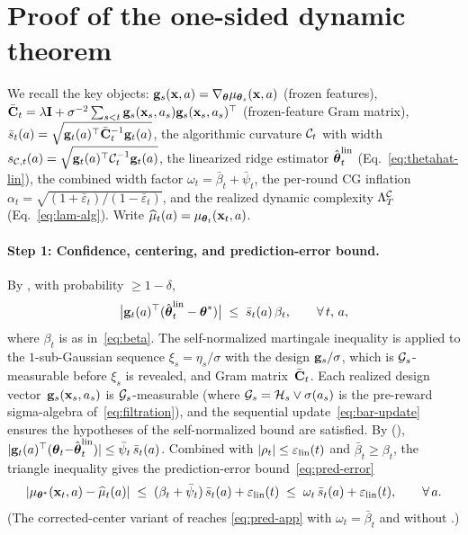 \section{Proof of the one-sided dynamic theorem}\label{app:proof}

We recall the key objects:
$\mathbf{g}_s(\mathbf{x},a)=\nabla_{\boldsymbol{\theta}}\mu_{\boldsymbol{\theta}_s}(\mathbf{x},a)$ (frozen features),
$\bar{\mathbf{C}}_t=\lambda\mathbf{I}+\sigma^{-2}\sum_{s<t}\mathbf{g}_s(\mathbf{x}_s,a_s)\mathbf{g}_s(\mathbf{x}_s,a_s)^\top$
(frozen-feature Gram matrix),
$\bar s_t(a)=\sqrt{\mathbf{g}_t(a)^\top\bar{\mathbf{C}}_t^{-1}\mathbf{g}_t(a)}$,
the algorithmic curvature $\mathcal{C}_t$ with width
$s_{\mathcal{C},t}(a)=\sqrt{\mathbf{g}_t(a)^\top\mathcal{C}_t^{-1}\mathbf{g}_t(a)}$,
the linearized ridge estimator $\hat{\boldsymbol{\theta}}_t^{\mathrm{lin}}$
(Eq.~\ref{eq:thetahat-lin}), the combined width factor
$\omega_t=\bar\beta_t+\bar\psi_t$, the per-round CG inflation
$\alpha_t=\sqrt{(1+\bar\varepsilon_t)/(1-\bar\varepsilon_t)}$, and the
realized dynamic complexity $\Lambda^{\mathcal{C}}_T$ (Eq.~\ref{eq:lam-alg}).
Write $\widehat\mu_t(a)=\mu_{\boldsymbol{\theta}_t}(\mathbf{x}_t,a)$.

\paragraph{Step 1: Confidence, centering, and prediction-error bound.}
By , with probability $\ge 1-\delta$,
\begin{equation}\label{eq:conf-app}
  \bigl|\mathbf{g}_t(a)^\top(\hat{\boldsymbol{\theta}}_t^{\mathrm{lin}}-\boldsymbol{\theta}^*)\bigr|
  \;\le\; \bar s_t(a)\,\beta_t,
  \qquad\forall\,t,\,a,
\end{equation}
where $\beta_t$ is as in~\eqref{eq:beta}.
The self-normalized martingale inequality
\citep{abbasi2011improved} is applied to the $1$-sub-Gaussian sequence
$\xi_s=\eta_s/\sigma$ with the design $\mathbf{g}_s/\sigma$, which is
$\mathcal{G}_s$-measurable before $\xi_s$ is revealed, and Gram matrix~$\bar{\mathbf{C}}_t$.
Each realized design vector~$\mathbf{g}_s(\mathbf{x}_s,a_s)$ is
$\mathcal{G}_s$-measurable (where $\mathcal{G}_s=\mathcal{H}_s\vee\sigma(a_s)$ is
the pre-reward sigma-algebra of~\eqref{eq:filtration}), and the sequential
update~\eqref{eq:bar-update} ensures the hypotheses
of the self-normalized bound are satisfied.
By  (),
$|\mathbf{g}_t(a)^\top(\boldsymbol{\theta}_t{-}\hat{\boldsymbol{\theta}}_t^{\mathrm{lin}})|\le
\bar\psi_t\,\bar s_t(a)$.
Combined with $|\rho_t|\le\varepsilon_{\mathrm{lin}}(t)$ and $\bar\beta_t\ge\beta_t$, the
triangle inequality gives the prediction-error
bound~\eqref{eq:pred-error}
\begin{equation}\label{eq:pred-app}
  |\mu_{\boldsymbol{\theta}^*}(\mathbf{x}_t,a)-\widehat\mu_t(a)|
  \;\le\;
  (\beta_t+\bar\psi_t)\,\bar s_t(a) + \varepsilon_{\mathrm{lin}}(t)
  \;\le\;
  \omega_t\,\bar s_t(a) + \varepsilon_{\mathrm{lin}}(t),
  \qquad\forall\,a .
\end{equation}
(The corrected-center variant of  reaches
\eqref{eq:pred-app} with $\omega_t=\bar\beta_t$ and without
.)

